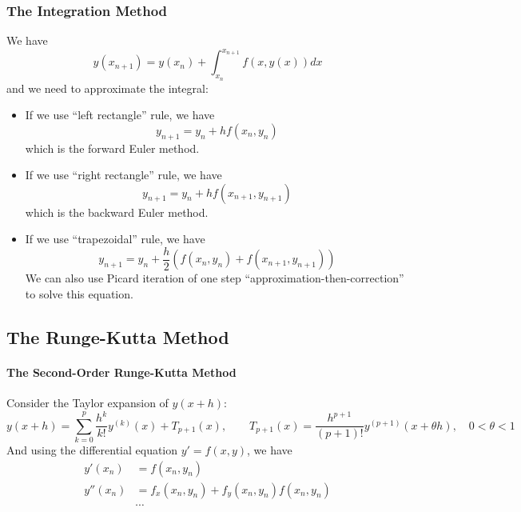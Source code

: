 \documentclass{matharticle}
\begin{document}
\subsubsection{The Integration Method}
We have
\begin{equation}
	y(x_{n+1}) = y(x_n) + \int_{x_n}^{x_{n+1}} f(x, y(x)) dx
\end{equation}
and we need to approximate the integral:
\begin{itemize}
	\item If we use ``left rectangle'' rule, we have
	      \begin{equation}
		      y_{n+1} = y_n + h f(x_n, y_n)
	      \end{equation}
	      which is the forward Euler method.
	\item If we use ``right rectangle'' rule, we have
	      \begin{equation}
		      y_{n+1} = y_n + h f(x_{n+1}, y_{n+1})
	      \end{equation}
	      which is the backward Euler method.
	\item If we use ``trapezoidal'' rule, we have
	      \begin{equation}
		      y_{n+1} = y_n + \frac{h}{2} (f(x_n, y_n) + f(x_{n+1}, y_{n+1}))
	      \end{equation}
	      We can also use Picard iteration of one step ``approximation-then-correction'' to solve this equation.
\end{itemize}

\subsection{The Runge-Kutta Method}
\paragraph{The Second-Order Runge-Kutta Method}
Consider the Taylor expansion of $y(x + h)$:
\begin{equation*}
	y(x + h) = \sum_{k=0}^{p} \frac{h^k}{k!} y^{(k)}(x) + T_{p+1}(x), \qquad T_{p+1}(x) = \frac{h^{p+1}}{(p+1)!} y^{(p+1)}(x + \theta h), \quad 0 < \theta < 1
\end{equation*}
And using the differential equation $y' = f(x, y)$, we have
\begin{equation*}
	\begin{aligned}
		y'(x_n)  & = f(x_n, y_n)                               \\
		y''(x_n) & = f_x(x_n, y_n) + f_y(x_n, y_n) f(x_n, y_n) \\
		         & \cdots
	\end{aligned}
\end{equation*}
\end{document}

